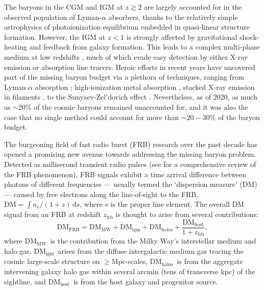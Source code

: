 \documentclass[twocolumn]{aastex63}
\newcommand{\dm}{\ensuremath{\mathrm{DM}}}
\newcommand{\dmhalo}{\ensuremath{\mathrm{DM}_\mathrm{halos}}}
\newcommand{\dmigm}{\ensuremath{\mathrm{DM}_\mathrm{igm}}}
\newcommand{\dmmw}{\ensuremath{\mathrm{DM}_\mathrm{MW}}}
\newcommand{\dmhost}{\ensuremath{\mathrm{DM}_\mathrm{host}}}
\newcommand{\zfrb}{\ensuremath{z_\mathrm{frb}}}
\begin{document}
\begin{CJK*}{UTF8}{gbsn}
The baryons in the CGM and IGM at $z\gtrsim 2$ are largely accounted for in the observed population of  Lyman-$\alpha$ absorbers, 
 thanks to the relatively simple astrophysics of photoionization equilibrium embedded in quasi-linear structure formation. 
However, the IGM at $z<1$ is strongly affected by gravitational shock-heating and feedback from galaxy formation.
This leads to a complex 
multi-phase medium at low redshifts \citep{cen:2006, smith:2011}, 
much of which evade easy detection by either X-ray emission or absorption line tracers.
Heroic efforts in recent years have uncovered part of the missing baryon budget via a plethora of techniques, ranging from 
Lyman-$\alpha$ absorption \citep{danforth:2008};
high-ionization metal absorption \citep{prochaska:2011,nicastro:2018}, stacked X-ray emission in filaments \citep{tanimura:2020}, 
to the Sunyaev-Zel'dovich effect \citep{tanimura:2019a, tanimura:2019,lim:2020}. 
Nevertheless, as of 2020, as much as $\sim 20\%$ of the cosmic baryons remained unaccounted for, and it was
also the case that no single method could account for more than $\sim 20-30\%$ of the baryon budget.

The burgeoning field of fast radio burst (FRB) research over the past decade has opened a promising new avenue 
towards addressing the missing baryon problem. Detected as millisecond transient radio pulses (see \citealt{cordes:2019} for 
a comprehensive review of the FRB phenomenon), 
FRB signals exhibit {a time arrival difference between photons of different frequencies} --- usually termed the `dispersion measure' (DM) --- caused by  
 free electrons along the line-of-sight to the FRB, $ \mathrm{DM} = \int n_\mathrm{e}/(1+z) \,\mathrm{d}s$, {where $s$ is the proper line element}. 
 The overall DM signal from an FRB at redshift \zfrb{} is thought to arise from several contributions: 
 \begin{equation}\label{eq:dm_all}
 \dm_\mathrm{FRB} = \dmmw + \dmigm + \dmhalo + \frac{\dmhost}{1+\zfrb},
 \end{equation}
 where \dmmw\ is the contribution from the Milky Way's interstellar medium and halo gas, \dmigm\ arises from the diffuse intergalactic
 medium gas tracing the cosmic large-scale structure on $\geq$Mpc-scales, \dmhalo\ is from the aggregate intervening galaxy halo gas within several arcmin (tens of transverse kpc) of the sightline, and \dmhost\ is from the host galaxy and progenitor source. 
 

\end{CJK*}
\end{document}
